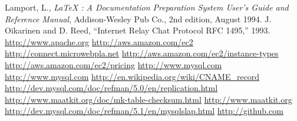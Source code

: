 \documentclass[12pt]{article}
\begin{document}
\begin{thebibliography}{99} 
 Lamport, L., {\it LaTeX : A
Documentation Preparation System User's Guide and Reference Manual},
Addison-Wesley Pub Co., 2nd edition, August 1994.  
 J. Oikarinen and D. Reed, “Internet Relay Chat Protocol RFC 1495,” 1993.  
 \url{http://www.apache.org} 
  \url{http://aws.amazon.com/ec2}
  \url{http://connect.microwebpla.net} 
 \url{http://aws.amazon.com/ec2/instance-types}
\url{http://aws.amazon.com/ec2/pricing} 
 \url{http://www.mysql.com} 
 \url{http://www.mysql.com}
 \url{http://en.wikipedia.org/wiki/CNAME\_record}
 \url{http://dev.mysql.com/doc/refman/5.0/en/replication.html} 
 \url{http://www.maatkit.org/doc/mk-table-checksum.html} 
 \url{http://www.maatkit.org} 
 \url{http://dev.mysql.com/doc/refman/5.1/en/mysqlslap.html} 
 \url{http://github.com} 
\end{thebibliography} 
\end{document}
